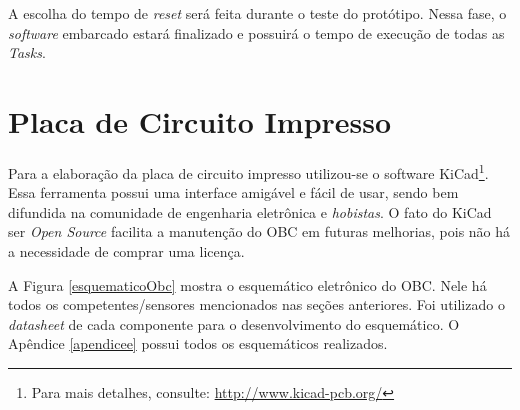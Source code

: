 A escolha do tempo de \textit{reset} será feita durante o teste do protótipo. Nessa fase, o \textit{software} embarcado estará finalizado e possuirá o tempo de execução de todas as \textit{Tasks}.

\newpage

\section{Placa de Circuito Impresso}

Para a elaboração da placa de circuito impresso utilizou-se o software KiCad\footnote{Para mais detalhes, consulte:  \url{http://www.kicad-pcb.org/}}. Essa ferramenta possui uma interface amigável e fácil de usar, sendo bem difundida na comunidade de engenharia eletrônica e \textit{hobistas}. O fato do KiCad ser \textit{Open Source} facilita a manutenção do OBC em futuras melhorias, pois não há a necessidade de comprar uma licença.

A Figura \ref{esquematicoObc} mostra o esquemático eletrônico do OBC. Nele há todos os competentes/sensores mencionados nas seções anteriores. Foi utilizado o \textit{datasheet} de cada componente para o desenvolvimento do esquemático. O Apêndice \ref{apendicee} possui todos os esquemáticos realizados.

